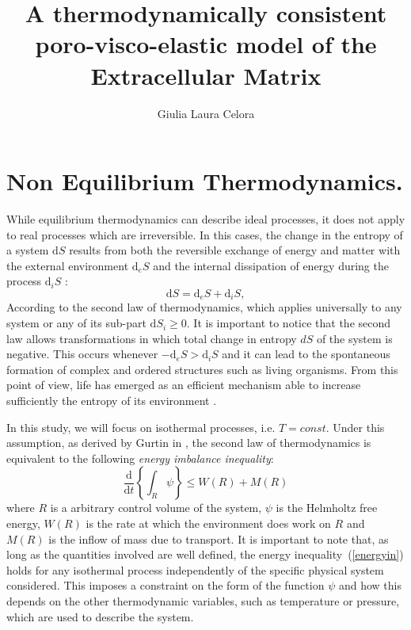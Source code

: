 \documentclass[runningheads]{llncs}
\renewcommand{\d}{\ensuremath{\text{d}}}
\begin{document}
%
\title{A thermodynamically consistent poro-visco-elastic model of the Extracellular Matrix}
%
%
\author{Giulia Laura Celora}
%
%
%
\maketitle              %
%
\begin{abstract}

\end{abstract}
%
%
%


\section{Non Equilibrium Thermodynamics.}
\label{secNET}
While equilibrium thermodynamics can describe ideal processes, it does not apply to real processes which are irreversible. In this cases, the change in the entropy of a system $\d S$ results from both the reversible exchange of energy and matter with the external environment $\d_eS$ and the internal dissipation of energy during the process $\d_iS$ \cite{NET}:
\begin{equation}
\d S = \d_eS + \d_iS, 
\end{equation}
According to the second law of thermodynamics, which applies universally to any system or any of its sub-part $\d S_i\ge 0$. It is important to notice that the second law allows transformations in which total change in entropy $d S$ of the system is negative. This occurs whenever $-\d_e S>\d_i S$ and it can lead to the spontaneous formation of complex and ordered structures such as living organisms. From this point of view, life has emerged as an efficient mechanism able to increase sufficiently the entropy of its environment \cite{JeremyEngland}.  

In this study, we will focus on isothermal processes, i.e. $T=const$. Under this assumption, as derived by Gurtin in \cite{GURTIN}, the second law of thermodynamics is equivalent to the following \textit{energy imbalance inequality}:
\begin{equation}
\frac{\d}{\d t} \left\{\int_R \psi \right\}\leq W(R) + M(R) \label{energyin}
\end{equation}
where $R$ is a arbitrary control volume of the system, $\psi$ is the Helmholtz free energy, $W(R)$ is the rate at which the environment does work on $R$ and $M(R)$ is the inflow of mass due to transport. It is important to note that, as long as the quantities involved are well defined, the energy inequality~(\ref{energyin}) holds for any isothermal process independently of the specific physical system considered. This imposes a constraint on the form of the function $\psi$ and how this depends on the other thermodynamic variables, such as temperature or pressure, which are used to describe the system. 
\end{document}
